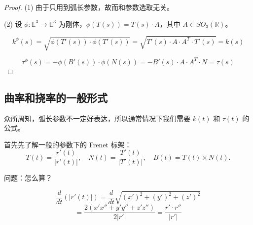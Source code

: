 \documentclass[lang=cn,10pt,thmcnt=section]{elegantbook}
\begin{document}
    \begin{proof}
    (1) 由于只用到弧长参数，故而和参数选取无关。
    
    (2) 设 $\phi: \mathbb{E}^3 \rightarrow \mathbb{E}^3$ 为刚体，$\phi(T(s)) = T(s) \cdot A$，其中 $A \in SO_3(\mathbb{R})$。
    
    \[
    k^\phi(s) = \sqrt{\phi(T'(s)) \cdot \phi(T'(s))} = \sqrt{T'(s) \cdot A \cdot A^T \cdot T'(s)} = k(s)
    \]
    
    \[
    \tau^\phi(s) = -\phi(B'(s)) \cdot \phi(N(s)) = -B'(s) \cdot A \cdot A^T \cdot N = \tau(s)
    \]
\end{proof}
\subsection{曲率和挠率的一般形式}
众所周知，弧长参数不一定好表达，所以通常情况下我们需要 $k(t)$ 和 $\tau(t)$ 的公式。

首先先了解一般的参数下的 Frenet 标架：
\[
T(t) = \frac{r'(t)}{|r'(t)|}, \quad N(t) = \frac{T'(t)}{|T'(t)|}, \quad B(t) = T(t) \times N(t).
\]

问题：怎么算？
\begin{theorem}[Frenet标架的导数]
    \[
    \frac{d}{dt}(|r'(t)|) = \frac{d}{dt}\sqrt{(x')^2 + (y')^2 + (z')^2}
    \]
    \[
    = \frac{2(x'x'' + y'y'' + z'z'')}{2|r'|} = \frac{r' \cdot r''}{|r'|}
    \]
    \end{theorem}
    
\end{document}

